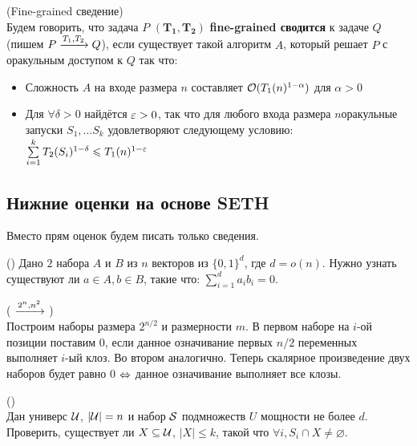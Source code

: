 \begin{definition}(Fine-grained сведение)\\
    Будем говорить, что задача $P$ $\mathbf{(T_1, T_2)}$ \textbf{fine-grained сводится} к задаче $Q$ (пишем $P \xrightarrow{T_1, T_2} Q$), если существует такой алгоритм $A$, который решает $P$ с оракульным доступом к $Q$ так что:
    \begin{itemize}
        \setlength\itemsep{-0.2em}
        \item Сложность $A$ на входе размера $n$ составляет $\mathcal{O}(T_1(n)^{1 - \alpha})$ для $\alpha > 0$
        \item Для $\forall \delta > 0$ найдётся $\varepsilon > 0$, так что для любого входа размера $n$оракульные запуски $S_1, \dots S_k$ удовлетворяют следующему условию: $\sum\limits_{i = 1}^k T_2(S_i)^{1 - \delta} \leqslant T_1(n)^{1 - \varepsilon}$
    \end{itemize}
\end{definition}

\subsection{Нижние оценки на основе SETH}

Вместо прям оценок будем писать только сведения.

\begin{problem}()
   Дано $2$ набора $A$ и $B$ из $n$ векторов из $\{0, 1\}^d$, где $d = o(n)$. Нужно узнать существуют ли $a \in A, b \in B$, такие что: $\sum_{i = 1}^{d} a_i b_i = 0$.
\end{problem}

\begin{reduction}( $\xrightarrow{2^n, n^2}$ )\\
    Построим наборы размера $2^{n/2}$ и размерности $m$. В первом наборе на $i$-ой позиции поставим 0, если данное означивание первых $n/2$ переменных выполняет $i$-ый клоз. Во втором аналогично. Теперь скалярное произведение двух наборов будет равно 0 $\Leftrightarrow$ данное означивание выполняет все клозы.
\end{reduction}

\begin{problem}()\\
   Дан универс $\mathcal{U}$, $|\mathcal{U}| = n$ и набор $\mathcal{S}$ подмножеств $U$ мощности не более $d$. Проверить, существует ли $X \subseteq \mathcal{U}$, $|X| \le k$, такой что $\forall i, S_i \cap X \neq \varnothing$.
\end{problem}


